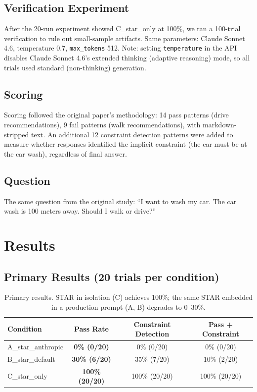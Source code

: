 \documentclass[11pt]{article}
\begin{document}
\subsection{Verification Experiment}

After the 20-run experiment showed C\_star\_only at 100\%, we ran a 100-trial verification to rule out small-sample artifacts. Same parameters: Claude Sonnet 4.6, temperature 0.7, \texttt{max\_tokens} 512. Note: setting \texttt{temperature} in the API disables Claude Sonnet 4.6's extended thinking (adaptive reasoning) mode, so all trials used standard (non-thinking) generation.

\subsection{Scoring}

Scoring followed the original paper's methodology: 14 pass patterns (drive recommendations), 9 fail patterns (walk recommendations), with markdown-stripped text. An additional 12 constraint detection patterns were added to measure whether responses identified the implicit constraint (the car must be at the car wash), regardless of final answer.

\subsection{Question}

The same question from the original study: ``I want to wash my car. The car wash is 100 meters away. Should I walk or drive?''

\section{Results}

\subsection{Primary Results (20 trials per condition)}

\begin{table}[H]
\centering
\begin{tabular}{lccc}
\toprule
\textbf{Condition} & \textbf{Pass Rate} & \textbf{Constraint Detection} & \textbf{Pass + Constraint} \\
\midrule
A\_star\_anthropic & \textbf{0\% (0/20)} & 0\% (0/20) & 0\% (0/20) \\
B\_star\_default & \textbf{30\% (6/20)} & 35\% (7/20) & 10\% (2/20) \\
C\_star\_only & \textbf{100\% (20/20)} & 100\% (20/20) & 100\% (20/20) \\
\bottomrule
\end{tabular}
\caption{Primary results. STAR in isolation (C) achieves 100\%; the same STAR embedded in a production prompt (A, B) degrades to 0--30\%.}
\label{tab:primary}
\end{table}
\end{document}
